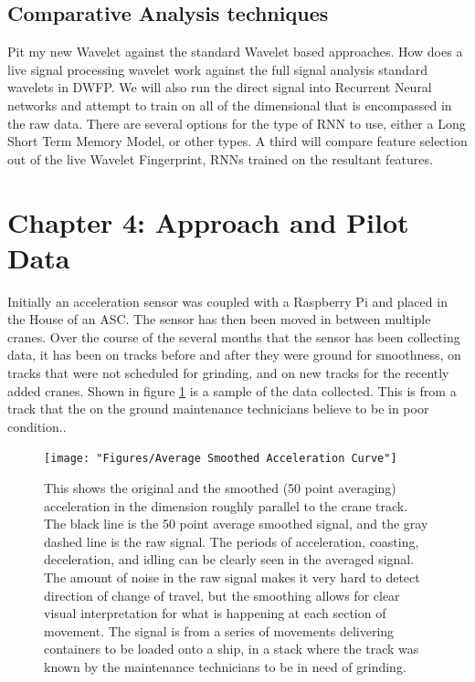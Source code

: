 \documentclass[journal=jacsat,manuscript=article]{achemso}
\begin{document}
\subsection{Comparative Analysis techniques}
Pit my new Wavelet against the standard Wavelet based approaches.  How does a live signal processing wavelet work against the full signal analysis standard wavelets in DWFP.  We will also run the direct signal into Recurrent Neural networks and attempt to train on all of the dimensional that is encompassed in the raw data.  There are several options for the type of RNN to use, either a Long Short Term Memory Model, or other types.  A third will compare feature selection out of the live Wavelet Fingerprint, RNNs trained on the resultant features. 

\pagebreak
\section{Chapter 4: Approach and Pilot Data}

Initially an acceleration sensor was coupled with a Raspberry Pi and placed in the House of an ASC. The sensor has then been moved in between multiple cranes. Over the course of the several months that the sensor has been collecting data, it has been on tracks before and after they were ground for smoothness, on tracks that were not scheduled for grinding, and on new tracks for the recently added cranes.  Shown in figure \ref{fig:Sample-Acceleration-Curve} is a sample of the data collected.  This is from a track that the on the ground maintenance technicians believe to be in poor condition.. 

\begin{figure}
	\centering
	\texttt{[image: "Figures/Average Smoothed Acceleration Curve"]}
	\caption[Sample Acceleration]{This shows the original and the smoothed (50 point averaging) acceleration in the dimension roughly parallel to the crane track. The black line is the 50 point average smoothed signal, and the gray dashed line is the raw signal.  The periods of acceleration, coasting, deceleration, and idling can be clearly seen in the averaged signal. The amount of noise in the raw signal makes it very hard to detect direction of change of travel, but the smoothing allows for clear visual interpretation for what is happening at each section of movement.  The signal is from a series of movements delivering containers to be loaded onto a ship, in a stack where the track was known by the maintenance technicians to be in need of grinding.}
	\label{fig:Sample-Acceleration-Curve}
\end{figure}
\end{document}
